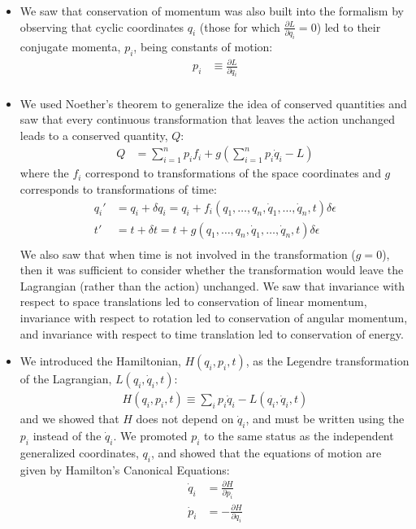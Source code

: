 \documentclass[10pt]{report}
\newcommand{\die}[2]{\frac{\partial #1}{\partial #2}}
\begin{document}
\begin{itemize}
\item We saw that conservation of momentum was also built into the formalism by observing that cyclic coordinates $q_i$ (those for which $\die{L}{q_i}=0$) led to their conjugate momenta, $p_i$, being constants of motion:
\begin{align*}
p_i&\equiv \die{L}{\dot q_i} \\
\end{align*}
\item We used Noether's theorem to generalize the idea of conserved quantities and saw that every continuous transformation that leaves the action unchanged leads to a conserved quantity, $Q$:
\begin{align*}
Q&=\sum_{i=1}^n p_if_i +g\left(\sum_{i=1}^n p_i\dot{q}_i-L\right)
\end{align*}
where the $f_i$ correspond to transformations of the space coordinates and $g$ corresponds to transformations of time:
\begin{align*}
q_i'&=q_i+\delta q_i=q_i+f_i(q_1,\dots ,q_n,\dot{q}_1,\dots ,\dot{q}_n, t)\delta\epsilon\\
t'&=t+\delta t=t+g(q_1,\dots ,q_n,\dot{q}_1,\dots ,\dot{q}_n, t)\delta\epsilon\\
\end{align*}
We also saw that when time is not involved in the transformation ($g=0$), then it was sufficient to consider whether the transformation would leave the Lagrangian (rather than the action) unchanged. We saw that invariance with respect to space translations led to conservation of linear momentum, invariance with respect to rotation led to conservation of angular momentum, and invariance with respect to time translation led to conservation of energy.
\item We introduced the Hamiltonian, $H(q_i,p_i, t)$, as the Legendre transformation of the Lagrangian, $L(q_i,\dot q_i, t)$:
\begin{align*}
H(q_i,p_i,t)\equiv \sum_ip_i\dot q_i-L(q_i,\dot q_i, t)
\end{align*}
and we showed that $H$ does not depend on $\dot q_i$, and must be written using the $p_i$ instead of the $\dot q_i$. We promoted $p_i$ to the same status as the independent generalized coordinates, $q_i$, and showed that the equations of motion are given by Hamilton's Canonical Equations:
\begin{align*}
\dot q_i&=\die{H}{p_i} \nonumber\\
\dot p_i &= -\die{H}{q_i}
\end{align*}

\end{itemize}
\end{document}
